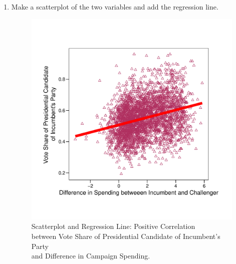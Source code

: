 \documentclass[12pt,letterpaper]{article}
\begin{document}
\begin{enumerate}
			\texttt This bi-variate linear regression model indicates that for \textbf{every 1-unit increase} in the difference in campaign spending between the incumbent and challenger, on average, the vote share for the Presidential Candidate of the Incumbent's Party increases by \textbf{approx. 0.02 unit points}.
			
			The coefficient has a p-value less than 0.001, which is less than a critical value of 0.05, giving evidence to reject the null hypothesis that the relationship between difference in campaign spending and vote share of the Incumbent Party's Presidential Candidate is zero - and giving evidence for the alternative hypothesis that the relationship is non-zero. It is not possible to indicate a causal relationship with this method.
		
		\item Make a scatterplot of the two variables and add the regression line.
		
			
		
			\begin{figure}[H]
				\centering
				\captionsetup{justification=centering, font = footnotesize}
				\caption{Scatterplot and Regression Line: Positive Correlation\\
					between Vote Share of Presidential Candidate of Incumbent's Party\\
					and Difference in Campaign Spending.}
				\label{fig:plot_Q2}
				\includegraphics[width=.75\textwidth, trim = 0 2cm 0 2cm, clip]{plot_Q2.pdf}
			\end{figure}
		

\end{enumerate}
\end{document}
